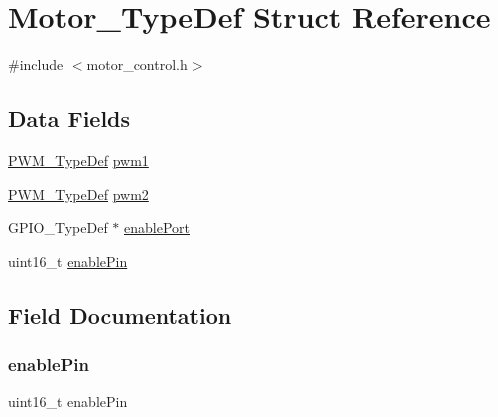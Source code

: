 \hypertarget{struct_motor___type_def}{}\section{Motor\+\_\+\+Type\+Def Struct Reference}
\label{struct_motor___type_def}


{\ttfamily \#include $<$motor\+\_\+control.\+h$>$}

\subsection*{Data Fields}
\begin{DoxyCompactItemize}
\item 
\hyperlink{struct_p_w_m___type_def}{P\+W\+M\+\_\+\+Type\+Def} \hyperlink{struct_motor___type_def_ab6053993e6628cef7e5e202a05e6a0ac}{pwm1}
\item 
\hyperlink{struct_p_w_m___type_def}{P\+W\+M\+\_\+\+Type\+Def} \hyperlink{struct_motor___type_def_afa92ea5c8db1b225b1c718099f986b8e}{pwm2}
\item 
G\+P\+I\+O\+\_\+\+Type\+Def $\ast$ \hyperlink{struct_motor___type_def_a0ed3538ba41cbf1643d12a76b8fcf6e1}{enable\+Port}
\item 
uint16\+\_\+t \hyperlink{struct_motor___type_def_aa334426c266c14b33d04af6e7da3b861}{enable\+Pin}
\end{DoxyCompactItemize}


\subsection{Field Documentation}
\mbox{\label{struct_motor___type_def_aa334426c266c14b33d04af6e7da3b861}} 
\subsubsection{\texorpdfstring{enable\+Pin}{enablePin}}
{\footnotesize\ttfamily uint16\+\_\+t enable\+Pin}

\mbox{\label{struct_motor___type_def_a0ed3538ba41cbf1643d12a76b8fcf6e1}} 
